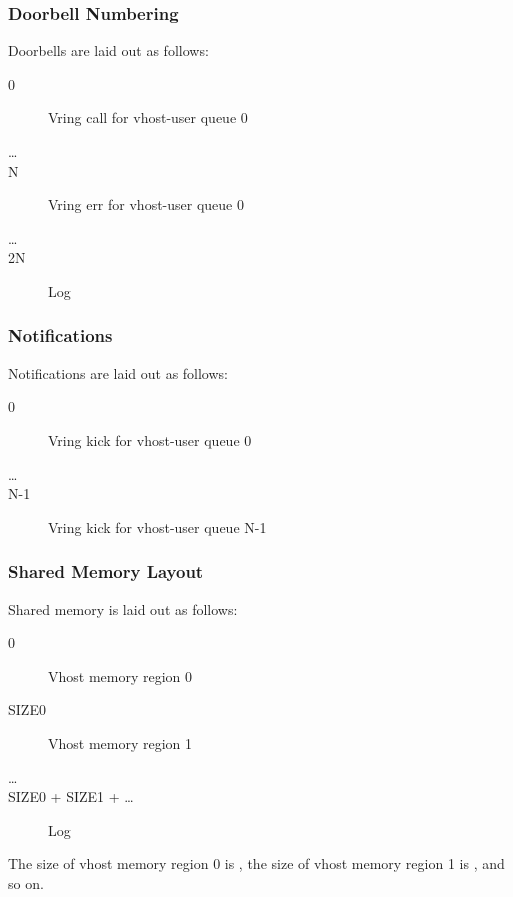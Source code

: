 \subsubsection{Doorbell Numbering}\label{sec:Device Types / Vhost-user Device Backend / Additional Device Resources over PCI / Doorbell Numbering}

Doorbells are laid out as follows:

\begin{description}
\item[0] Vring call for vhost-user queue 0
\item[\ldots]
\item[N] Vring err for vhost-user queue 0
\item[\ldots]
\item[2N] Log
\end{description}

\subsubsection{Notifications}\label{sec:Device Types / Vhost-user Device Backend / Additional Device Resources over PCI / Notifications}

Notifications are laid out as follows:

\begin{description}
\item[0] Vring kick for vhost-user queue 0
\item[\ldots]
\item[N-1] Vring kick for vhost-user queue N-1
\end{description}

\subsubsection{Shared Memory Layout}\label{sec:Device Types / Vhost-user Device Backend / Additional Device Resources over PCI / Shared Memory Layout}

Shared memory is laid out as follows:

\begin{description}
\item[0] Vhost memory region 0
\item[SIZE0] Vhost memory region 1
\item[\ldots]
\item[SIZE0 + SIZE1 + \ldots] Log
\end{description}

The size of vhost memory region 0 is , the size of vhost memory
region 1 is , and so on.

